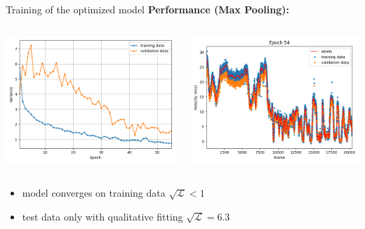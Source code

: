 \begin{frame}{Training of the optimized model}
	\textbf{Performance (Max Pooling):}
	\begin{columns}[c]
		\begin{column}{0.5\textwidth}
			\includegraphics[width=\textwidth]{imgs/normal_training_shuffle.png}
		\end{column}
		\begin{column}{0.5\textwidth}
			\includegraphics[width=\textwidth]{imgs/normal_performance_shuffle.png}
		\end{column}
	\end{columns}
	\begin{itemize}
		\item model converges on training data $\sqrt{\mathcal{L}} < 1$
		\item test data only with qualitative fitting $\sqrt{\mathcal{L}} = 6.3$
	\end{itemize}
\end{frame}

